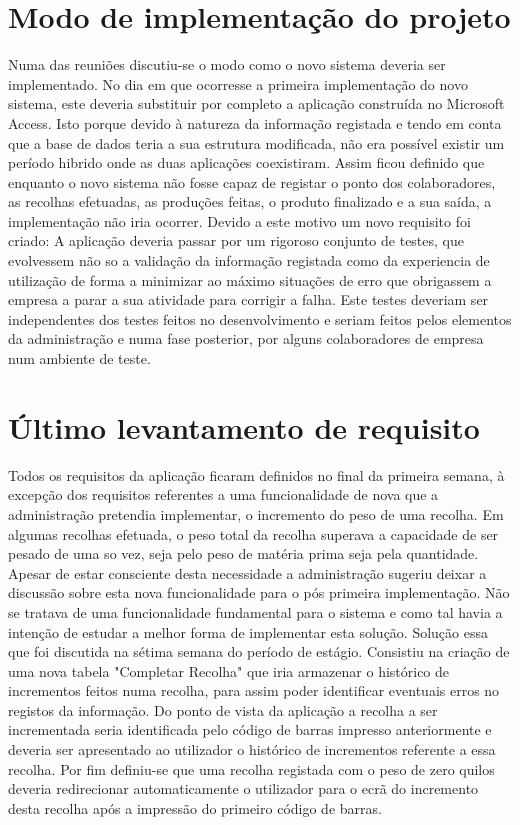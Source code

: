 \section{Modo de implementação do projeto}
Numa das reuniões discutiu-se o modo como o novo sistema deveria ser implementado. No dia em que ocorresse a primeira implementação do novo sistema, este deveria substituir por completo a aplicação construída no Microsoft Access. Isto porque devido à natureza da informação registada e tendo em conta que a base de dados teria a sua estrutura modificada, não era possível existir um período hibrido onde as duas aplicações coexistiram. Assim ficou definido que enquanto o novo sistema não fosse capaz de registar o ponto dos colaboradores, as recolhas efetuadas, as produções feitas, o produto finalizado e a sua saída, a implementação não iria ocorrer. Devido a este motivo um novo requisito foi criado: A aplicação deveria passar por um rigoroso conjunto de testes, que evolvessem não so a validação da informação registada como da experiencia de utilização de forma a minimizar ao máximo situações de erro que obrigassem a empresa a parar a sua atividade para corrigir a falha. Este testes deveriam ser independentes dos testes feitos no desenvolvimento e seriam feitos pelos elementos da administração e numa fase posterior, por alguns colaboradores de empresa num ambiente de teste.

\section{Último levantamento de requisito}
Todos os requisitos da aplicação ficaram definidos no final da primeira semana, à excepção dos requisitos referentes a uma funcionalidade de nova que a administração pretendia implementar, o incremento do peso de uma recolha. Em algumas recolhas efetuada, o peso total da recolha superava a capacidade de ser pesado de uma so vez, seja pelo peso de matéria prima seja pela quantidade. Apesar de estar consciente desta necessidade a administração sugeriu deixar a discussão sobre esta nova funcionalidade para o pós primeira implementação. Não se tratava de uma funcionalidade fundamental para o sistema e como tal havia a intenção de estudar a melhor forma de implementar esta solução. Solução essa que foi discutida na sétima semana do período de estágio. Consistiu na criação de uma nova tabela "Completar Recolha" que iria armazenar o histórico de incrementos feitos numa recolha, para assim poder identificar eventuais erros no registos da informação. Do ponto de vista da aplicação a recolha a ser incrementada seria identificada pelo código de barras impresso anteriormente e deveria ser apresentado ao utilizador o histórico de incrementos referente a essa recolha. Por fim definiu-se que uma recolha registada com o peso de zero quilos deveria redirecionar automaticamente o utilizador para o ecrã do incremento desta recolha após a impressão do primeiro código de barras.

